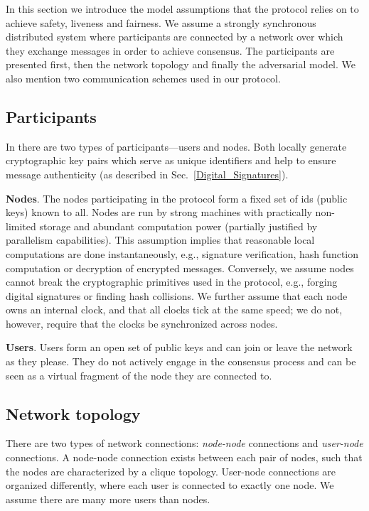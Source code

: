 In this section we introduce the model assumptions that the \name protocol relies on to achieve safety, liveness and fairness. We assume a strongly synchronous distributed system where participants are connected by a network over which they exchange messages in order to achieve consensus. The participants are presented first, then the network topology and finally the adversarial model. We also mention two communication schemes used in our protocol.

\subsection{Participants}
In \name there are two types of participants---users and nodes. Both locally generate cryptographic key pairs which serve as unique identifiers and help to ensure message authenticity (as described in Sec.~\ref{Digital_Signatures}).

\textbf{Nodes}.
The nodes participating in the protocol form a fixed set of ids (public keys) known to all. 
Nodes are run by strong machines with practically non-limited storage and abundant computation power (partially justified by parallelism capabilities).  
This assumption implies that reasonable local computations are done instantaneously, e.g., signature verification, hash function computation or decryption of encrypted messages. Conversely, we assume nodes cannot break the cryptographic primitives used in the protocol, e.g., forging digital signatures or finding hash collisions. We further assume that each node owns an internal clock, and that all clocks tick at the same speed; we do not, however, require that the clocks be synchronized across nodes.

\textbf{Users}. Users form an open set of public keys and can join or leave the network as they please. They do not actively engage in the consensus process and can be seen as a virtual fragment of the node they are connected to.

\subsection{Network topology}
There are two types of network connections: \emph{node-node} connections and \emph{user-node} connections. A node-node connection exists between each pair of nodes, such that the nodes are characterized by a clique topology.  
User-node connections are organized differently, where each user is connected to exactly one node. We assume there are many more users than nodes. 


